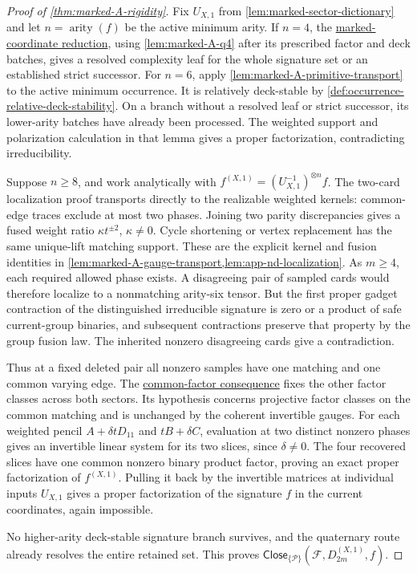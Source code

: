 \documentclass[11pt,letterpaper,onecolumn]{article}
\theoremstyle{plain}
\theoremstyle{definition}
\theoremstyle{remark}
\newcommand{\cF}{\mathcal F}
\newcommand{\cP}{\mathscr P}
\newcommand{\DihXone}[1]{{D_{#1}^{(X,1)}}}
\newcommand{\Close}{\mathsf{Close}}
\newcommand{\arity}{\operatorname{arity}}
\begin{document}
\begin{proof}[Proof of \cref{thm:marked-A-rigidity}]
Fix \(U_{X,1}\) from \cref{lem:marked-sector-dictionary} and
let \(n=\arity(f)\) be the active minimum arity.  If \(n=4\), the
\hyperref[par:marked-coordinate-reduction]{marked-coordinate reduction},
using \cref{lem:marked-A-q4} after its prescribed factor and deck batches,
gives a resolved complexity leaf for the whole signature set or an established strict successor.
For \(n=6\), apply \cref{lem:marked-A-primitive-transport} to the active
minimum occurrence.  It is relatively deck-stable by
\cref{def:occurrence-relative-deck-stability}. On a branch without a
resolved leaf or strict successor, its lower-arity batches have already
been processed.  The weighted support and polarization calculation in
that lemma gives a proper factorization, contradicting irreducibility.

Suppose \(n\ge8\), and work analytically with
\(f^{(X,1)}=(U_{X,1}^{-1})^{\otimes n}f\).
The two-card localization proof transports directly to the realizable
weighted kernels: common-edge traces exclude at most two phases. Joining
two parity discrepancies gives a fused weight ratio
\(\kappa t^{\pm2}\), \(\kappa\ne0\). Cycle shortening or vertex
replacement has the same unique-lift matching support.  These are the
explicit kernel and fusion identities in
\cref{lem:marked-A-gauge-transport,lem:app-nd-localization}.
As \(m\ge4\), each required allowed phase exists.  A disagreeing pair
of sampled cards would therefore localize to a nonmatching arity-six tensor.  But the first proper gadget contraction of the distinguished irreducible signature is
zero or a product of safe current-group binaries, and subsequent
contractions preserve that property by the group fusion law.  The
inherited nonzero disagreeing cards give a contradiction.

Thus at a fixed deleted pair all nonzero samples have one matching and
one common varying edge.  The
\hyperref[par:nd-common-factor-consequence]{common-factor consequence}
fixes the other factor classes across both sectors. Its hypothesis concerns
projective factor classes on the common matching and is unchanged by the
coherent invertible gauges.
For each weighted pencil \(A+\delta tD_{11}\) and \(tB+\delta C\),
evaluation at two distinct nonzero phases gives an invertible linear
system for its two slices, since \(\delta\ne0\). The four recovered
slices have one common nonzero binary product factor, proving an exact
proper factorization of \(f^{(X,1)}\).  Pulling it back by the
invertible matrices at individual inputs \(U_{X,1}\) gives a proper
factorization of the signature \(f\) in the current coordinates, again impossible.

No higher-arity deck-stable signature branch survives, and the quaternary route
already resolves the entire retained set.  This proves \(\Close_{\{\cP\}}(\cF,\DihXone{2m},f)\).
\end{proof}
\end{document}
